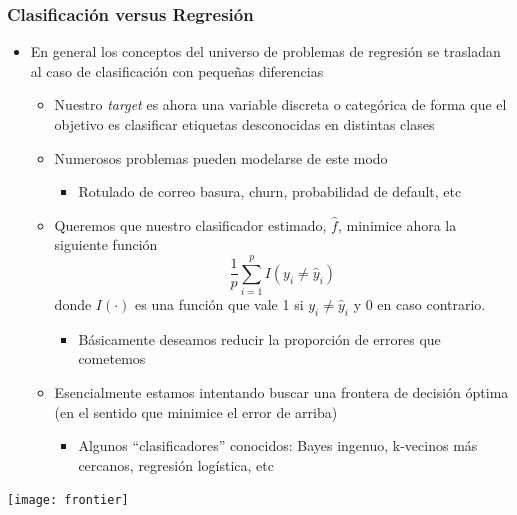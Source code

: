 \documentclass[leqno, 10pt, envcountsect]{beamer}
\numberwithin{equation}{section}
\theoremstyle{definition}
\theoremstyle{example}
\numberwithin{figure}{section}
\numberwithin{table}{section}
\let\olditem\item
\renewcommand{\item}{%
\olditem\vspace{1pt}}
\begin{document}
\begin{frame}[fragile=singleslide]
  \frametitle{Clasificación versus Regresión}
\begin{itemize}
  \item En general los conceptos del universo de problemas de regresión se
    trasladan al caso de clasificación con pequeñas diferencias
    \begin{itemize}
      \item Nuestro \textit{target} es ahora una variable discreta o
        categórica de forma que el objetivo es clasificar etiquetas
        desconocidas en distintas clases
      \item Numerosos problemas pueden modelarse de este modo
        \begin{itemize}
          \item Rotulado de correo basura, churn, probabilidad de default, etc
        \end{itemize}
      \item Queremos que nuestro clasificador estimado, $\hat{f}$, minimice
        ahora la siguiente función
      \begin{equation*}
        \frac{1}{p}\sum_{i=1}^{p}I(y_{i} \not = \hat{y}_{i})
      \end{equation*}
      donde $I(\cdot)$ es una función que vale 1 si $y_{i} \not = \hat{y}_{i}$
        y 0 en caso contrario.
        \begin{itemize}
          \item Básicamente deseamos reducir la proporción de errores que
            cometemos
        \end{itemize}
      \item Esencialmente estamos intentando buscar una frontera de decisión
        óptima (en el sentido que minimice el error de arriba)
        \begin{itemize}
          \item Algunos \enquote{clasificadores} conocidos: Bayes ingenuo,
            k-vecinos más cercanos, regresión logística, etc
        \end{itemize}
    \end{itemize}
\end{itemize}
\begin{center}
  \texttt{[image: frontier]}
\end{center}
\end{frame}
\end{document}
